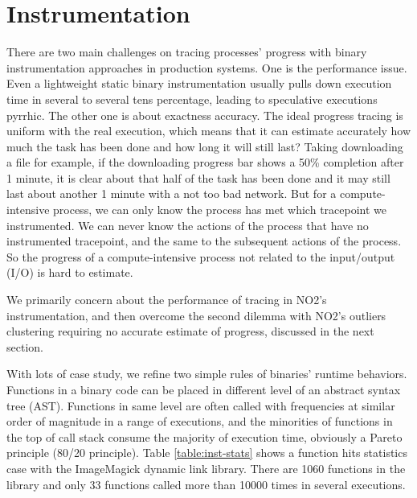 \section{Instrumentation}

There are two main challenges on tracing processes' progress with binary instrumentation approaches in production systems. One is the performance issue. Even a lightweight static binary instrumentation usually pulls down execution time in several to several tens percentage, leading to speculative executions pyrrhic.  The other one is about exactness accuracy. The ideal progress tracing is uniform with the real execution, which means that it can estimate accurately how much the task has been done and how long it will still last? Taking downloading a file for example, if the downloading progress bar shows a 50\% completion after 1 minute, it is clear about that half of the task has been done and it may still last about another 1 minute with a not too bad network. But for a compute-intensive process, we can only know the process has met which tracepoint we instrumented. We can never know the actions of the process that have no instrumented tracepoint, and the same to the subsequent actions of the process. So the progress of a compute-intensive process not related to the input/output (I/O) is hard to estimate.

We primarily concern about the performance of tracing in NO2's instrumentation, and then overcome the second dilemma with NO2's outliers clustering requiring no accurate estimate of progress, discussed in the next section.

With lots of case study, we refine two simple rules of binaries' runtime behaviors. Functions in a binary code can be placed in different level of an abstract syntax tree (AST). Functions in same level are often called with frequencies at similar order of magnitude in a range of executions, and the minorities of functions in the top of call stack consume the majority of execution time, obviously a Pareto principle (80/20 principle). Table \ref{table:inst-stats} shows a function hits statistics case with the ImageMagick dynamic link library. There are 1060 functions in the library and only 33 functions called more than 10000 times in several executions.

